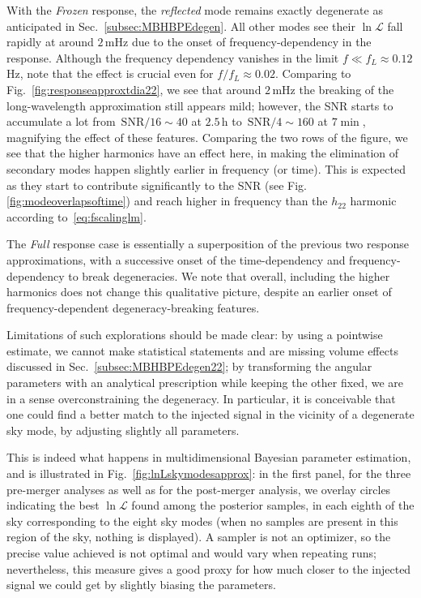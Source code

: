 \documentclass[aps,showpacs,twocolumn,prd,superscriptaddress,nofootinbib]{revtex4-1}
\newcommand\calL{{\mathcal{L}}}
\newcommand{\SNR}{\,\mathrm{SNR}}
\newcommand{\mHz}{\,\mathrm{mHz}}
\begin{document}
With the \textit{Frozen} response, the \textit{reflected} mode remains exactly degenerate as anticipated in Sec.~\ref{subsec:MBHBPEdegen}. All other modes see their $\ln \calL$ fall rapidly at around $2\mHz$ due to the onset of frequency-dependency in the response. Although the frequency dependency vanishes in the limit $f\ll f_L\approx 0.12$ Hz, note that the effect is crucial even for $f/f_L\approx 0.02$. Comparing to Fig.~\ref{fig:responseapproxtdia22}, we see that around $2\mHz$ the breaking of the long-wavelength approximation still appears mild; however, the SNR starts to accumulate a lot from $\SNR/16 \sim 40$ at $2.5\, \mathrm{h}$ to $\SNR/4 \sim 160$ at $7\min$, magnifying the effect of these features. Comparing the two rows of the figure, we see that the higher harmonics have an effect here, in making the elimination of secondary modes happen slightly earlier in frequency (or time). This is expected as they start to contribute significantly to the SNR (see Fig.\ref{fig:modeoverlapsoftime}) and reach higher in frequency than the $h_{22}$ harmonic according to~\eqref{eq:fscalinglm}.

The \textit{Full} response case is essentially a superposition of the previous two response approximations, with a successive onset of the time-dependency and frequency-dependency to break degeneracies. We note that overall, including the higher harmonics does not change this qualitative picture, despite an earlier onset of frequency-dependent degeneracy-breaking features.

Limitations of such explorations should be made clear: by using a pointwise estimate, we cannot make statistical statements and are missing volume effects discussed in Sec.~\ref{subsec:MBHBPEdegen22}; by transforming the angular parameters with an analytical prescription while keeping the other fixed, we are in a sense overconstraining the degeneracy. In particular, it is conceivable that one could find a better match to the injected signal in the vicinity of a degenerate sky mode, by adjusting slightly all parameters.

This is indeed what happens in multidimensional Bayesian parameter estimation, and is illustrated in Fig.~\ref{fig:lnLskymodesapprox}: in the first panel, for the three pre-merger analyses as well as for the post-merger analysis, we overlay circles indicating the best $\ln \calL$ found among the posterior samples, in each eighth of the sky corresponding to the eight sky modes (when no samples are present in this region of the sky, nothing is displayed). A sampler is not an optimizer, so the precise value achieved is not optimal and would vary when repeating runs; nevertheless, this measure gives a good proxy for how much closer to the injected signal we could get by slightly biasing the parameters.
\end{document}
